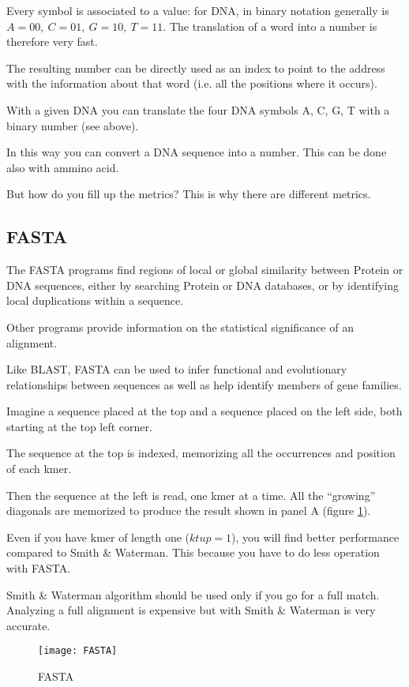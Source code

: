 Every symbol is associated to a value: for DNA, in binary notation
generally is $A=00,\ C=01,\ G=10,\ T=11$. The translation of a word into a
number is therefore very fast.

The resulting number can be directly used as an index to point
to the address with the information about that word (i.e. all the positions
where it occurs).

With a given DNA you can translate the four DNA symbols A, C, G, T with a
binary number (see above).

In this way you can convert a DNA sequence into a number.
This can be done also with ammino acid.

But how do you fill up the metrics? This is why there are different metrics.

\subsection{FASTA}

The FASTA programs find regions of local or global similarity between
Protein or DNA sequences, either by searching Protein or DNA databases, or by
identifying local duplications within a sequence.

Other programs provide information on the statistical significance of an
alignment.

Like BLAST, FASTA can be used to infer functional and evolutionary relationships
between sequences as well as help identify members of gene families.

Imagine a sequence placed at the top and a sequence placed on the left side,
both starting at the top left corner.

The sequence at the top is indexed, memorizing all the occurrences and
position of each kmer.

Then the sequence at the left is read, one kmer at a time.
All the ``growing'' diagonals are memorized to produce the result shown
in panel A (figure \ref{fig:fasta}).

Even if you have kmer of length one ($ktup = 1$), you will find better
performance compared to Smith \& Waterman. This because you have to do less
operation with FASTA.

Smith \& Waterman algorithm should be used only if you go for a full match.
Analyzing a full alignment is expensive but with Smith \& Waterman
is very accurate.

\begin{figure}[H]
  \centering
  \texttt{[image: FASTA]}
  \caption{FASTA}
  \label{fig:fasta}
\end{figure}

